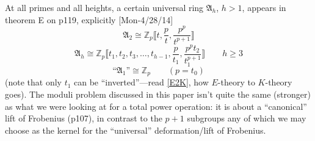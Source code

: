 \documentclass{rs}
\theoremstyle{definition}
\theoremstyle{remark}
\newcommand{\mb}[1]{\mathbb{#1}}
\newcommand{\mf}[1]{\mathfrak{#1}}
\newcommand{\BZ}{{\mb Z}}
\numberwithin{equation}{section}
\numberwithin{thm}{section}
\begin{document}
At all primes and all heights, a certain universal ring $\mf A_h$, $h > 1$, appears in theorem E on p119, explicitly [Mon-4/28/14] 
\[
 {\mf A_2} \cong \BZ_p \llbracket t, \frac{p}{t}, \frac{p^p}{t^{p+1}} \rrbracket 
\]
\[
 {\mf A_h} \cong \BZ_p \llbracket t_1, t_2, t_3, \ldots, t_{h-1}, \frac{p}{t_1}, \frac{p^p t_2}{t_1^{p+1}} \rrbracket \qquad h \geq 3 
\]
\[
 \text{``${\mf A_1}$''} \cong \BZ_p \qquad (p = t_0) 
\]
(note that only $t_1$ can be ``inverted''---read \href{http://arxiv.org/abs/1404.0717}{[E2K]}, how $E$-theory to $K$-theory goes).  
The moduli problem discussed in this paper isn't quite the same (stronger) as what we were looking at for a total power operation: 
it is about a ``canonical'' lift of Frobenius (p107), 
in contrast to the $p+1$ subgroups any of which we may choose as the kernel for the ``universal'' deformation/lift of Frobenius.  
\end{document}
